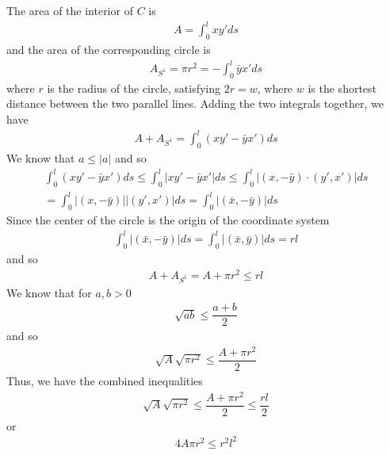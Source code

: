 \documentclass{article}
\begin{document}
	The area of the interior of $C$ is
	\begin{gather*}
		A = \int_0^l x y' ds
	\end{gather*}
	and the area of the corresponding circle is
	\begin{gather*}
		A_{S^1} = \pi r^2 = - \int_0^l \bar{y} x' ds
	\end{gather*}
	where $r$ is the radius of the circle, satisfying $2r = w$, where $w$ is the shortest distance between the two parallel lines. Adding the two integrals together, we have
	\begin{gather*}
		A + A_{S^1} = \int_0^l \left( x y' - \bar{y} x' \right) ds
	\end{gather*}
	We know that $a \leq |a|$ and so
	\begin{gather*}
		\int_0^l \left( x y' - \bar{y} x' \right) ds \leq \int_0^l \left| x y' - \bar{y} x' \right| ds \leq \int_0^l \left| \left( x, -\bar{y} \right) \cdot \left( y', x' \right) \right| ds \\
		= \int_0^l \left| \left( x, -\bar{y} \right) \right| \left| \left( y', x' \right) \right| ds = \int_0^l \left| \left( \bar{x}, -\bar{y} \right) \right| ds
	\end{gather*}
	Since the center of the circle is the origin of the coordinate system
	\begin{gather*}
		\int_0^l \left| \left( \bar{x}, -\bar{y} \right) \right| ds = \int_0^l \left| \left( \bar{x}, \bar{y} \right) \right| ds = rl
	\end{gather*}
	and so
	\begin{gather*}
		A + A_{S^1} = A + \pi r^2 \leq rl
	\end{gather*}
	We know that for $a, b > 0$
	\begin{gather*}
		\sqrt{ab} \leq \dfrac{a + b}{2}
	\end{gather*}
	and so
	\begin{gather*}
		\sqrt{A} \sqrt{\pi r^2} \leq \dfrac{A + \pi r^2}{2}
	\end{gather*}
	Thus, we have the combined inequalities
	\begin{gather*}
		\sqrt{A} \sqrt{\pi r^2} \leq \dfrac{A + \pi r^2}{2} \leq \dfrac{rl}{2}
	\end{gather*}
	or
	\begin{gather*}
		4 A \pi r^2 \leq r^2 l^2
	\end{gather*}
	
\end{document}
